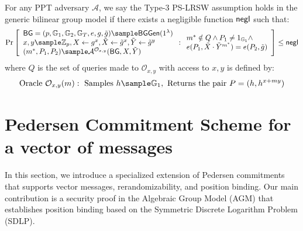\begin{definition}
For any PPT adversary $\mathcal{A}$, we say the Type-3 PS-LRSW assumption holds in the generic bilinear group model if there exists a negligible function $\mathsf{negl}$ such that:
$$\Pr\left[\begin{array}{l}
    \BG = (p, \G_1, \G_2, \G_T, e, g, \tilde{g}) \sample \BGGen(1^\lambda) \\
    x,y \sample \Z_p, X \gets g^x, \tilde{X} \gets \tilde{g}^x, \tilde{Y} \gets \tilde{g}^y \\
    (m^*, P_1, P_2) \sample \mathcal{A}^{\mathcal{O}_{x,y}}(\BG, X, \tilde{Y})
\end{array} : \begin{array}{l}
    m^* \notin Q \land P_1 \neq 1_{\G_1} \land \\
    e(P_1, \tilde{X} \cdot \tilde{Y}^{m^*}) = e(P_2, \tilde{g})
\end{array}\right] \leq \negl$$
where $Q$ is the set of queries made to $\mathcal{O}_{x,y}$ with access to $x,y$ is defined by:
\[
\text{Oracle }\mathcal{O}_{x,y}(m): \text{ Samples } h \sample \G_1, \text{ Returns the pair } P = (h, h^{x+my})
\]

\end{definition}





% 
% 


























% 
% 


\newpage
\section{Pedersen Commitment Scheme for a vector of messages}\label{sec:commitment}
In this section, we introduce a specialized extension of Pedersen commitments that supports vector messages, rerandomizability, and position binding. Our main contribution is a security proof in the Algebraic Group Model (AGM) that establishes position binding based on the Symmetric Discrete Logarithm Problem (SDLP).


